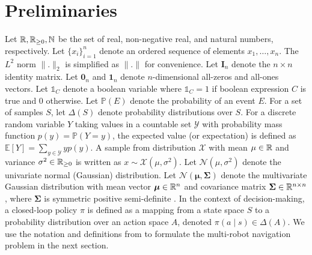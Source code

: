 \documentclass{article}
\begin{document}
\section{Preliminaries}

Let $\mathbb{R}, \mathbb{R}_{\geq 0}, \mathbb{N}$ be the set of real, non-negative real, and natural numbers, respectively. Let $\{x_i\}_{i=1}^n$ denote an ordered sequence of elements $x_1, \ldots, x_n$. The $L^2$ norm $\|.\|_2$ is simplified as $\|.\|$ for convenience. Let $\mathbf{I}_n$ denote the $n \times n$ identity matrix. Let $\mathbf{0}_n$ and $\mathbf{1}_n$ denote $n$-dimensional all-zeros and all-ones vectors. Let $\mathds{1}_C$ denote a boolean variable where $\mathds{1}_C=1$ if boolean expression $C$ is true and $0$ otherwise. Let $\mathbb{P}(E)$ denote the probability of an event $E$. For a set of samples $S$, let $\Delta(S)$ denote probability distributions over $S$. For a discrete random variable $Y$ taking values in a countable set $\mathcal{Y}$ with probability mass function $p(y) = \mathbb{P}(Y=y)$, the expected value (or expectation) is defined as $\mathbb{E}[Y] = \sum_{y \in \mathcal{Y}} y p(y)$. A sample from distribution $\mathcal{X}$ with mean $\mu \in \mathbb{R}$ and variance $\sigma^2 \in \mathbb{R}_{\geq 0}$ is written as $x \sim \mathcal{X}(\mu, \sigma^2)$. Let $\mathcal{N}(\mu, \sigma^2)$ denote the univariate normal (Gaussian) distribution. Let $\mathcal{N}(\bm{\mu}, \mathbf{\Sigma})$ denote the multivariate Gaussian distribution with mean vector $\bm{\mu} \in \mathbb{R}^n$ and covariance matrix $\mathbf{\Sigma} \in \mathbb{R}^{n \times n}$, where $\mathbf{\Sigma}$ is symmetric positive semi-definite \citep{bishop2006pattern}. In the context of decision-making, a closed-loop policy $\pi$ is defined as a mapping from a state space $S$ to a probability distribution over an action space $A$, denoted $\pi(a \mid s) \in \Delta(A)$. We use the notation and definitions from \citet{choset2005} to formulate the multi-robot navigation problem in the next section.
\end{document}
